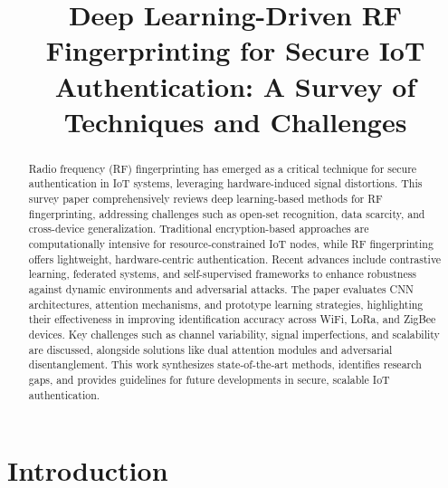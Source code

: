 \documentclass[conference]{IEEEtran}
\begin{document}
\title{Deep Learning-Driven RF Fingerprinting for Secure IoT Authentication: A Survey of Techniques and Challenges}

\author{
}

\maketitle

\begin{abstract}
Radio frequency (RF) fingerprinting has emerged as a critical technique for secure authentication in IoT systems, leveraging hardware-induced signal distortions. This survey paper comprehensively reviews deep learning-based methods for RF fingerprinting, addressing challenges such as open-set recognition, data scarcity, and cross-device generalization. Traditional encryption-based approaches are computationally intensive for resource-constrained IoT nodes, while RF fingerprinting offers lightweight, hardware-centric authentication. Recent advances include contrastive learning, federated systems, and self-supervised frameworks to enhance robustness against dynamic environments and adversarial attacks. The paper evaluates CNN architectures, attention mechanisms, and prototype learning strategies, highlighting their effectiveness in improving identification accuracy across WiFi, LoRa, and ZigBee devices. Key challenges such as channel variability, signal imperfections, and scalability are discussed, alongside solutions like dual attention modules and adversarial disentanglement. This work synthesizes state-of-the-art methods, identifies research gaps, and provides guidelines for future developments in secure, scalable IoT authentication.
\end{abstract}

\begin{IEEEkeywords}
\end{IEEEkeywords}


\section{Introduction}
\end{document}

